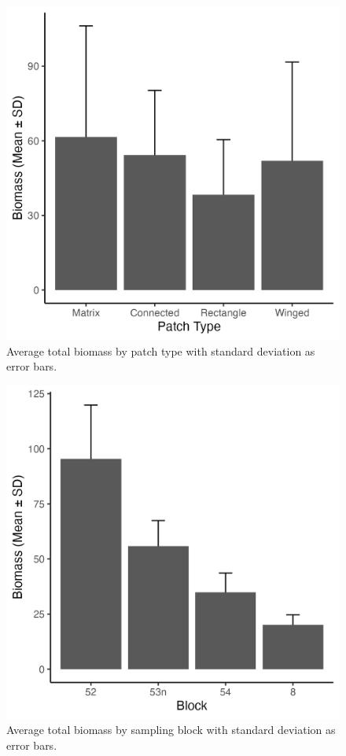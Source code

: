 \documentclass[
  man, donotrepeattitle]{apa6}
\begin{document}
\newpage

\begin{figure}[H]

{\centering \includegraphics[width=0.7\linewidth,]{images/avg_bmass_patch_plot} 

}

\caption{Average total biomass by patch type with standard deviation as error bars.}\label{fig:patch-bmass}
\end{figure}

\newpage

\begin{figure}[H]

{\centering \includegraphics[width=0.7\linewidth,]{images/avg_bmass_block_plot} 

}

\caption{Average total biomass by sampling block with standard deviation as error bars.}\label{fig:block-bmass}
\end{figure}
\end{document}
